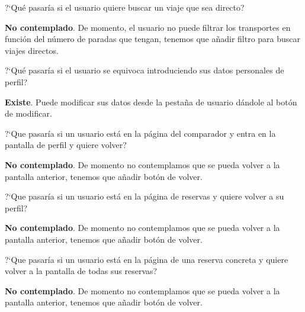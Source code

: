 \begin{escenario} %
    \centering
?`Qué pasaría si el usuario quiere buscar un viaje que sea directo? 
\begin{solucion} \centering
    \textbf{No contemplado}. De momento, el usuario no puede filtrar los transportes en función del número de paradas que tengan, tenemos que añadir filtro para buscar viajes directos.
\end{solucion}
\end{escenario}

\begin{escenario} %
    \centering
?`Qué pasaría si el usuario se equivoca introduciendo sus datos personales de perfil? 

\begin{solucion} \centering
    \textbf{Existe}. Puede modificar sus datos desde la pestaña de usuario dándole al botón de modificar.
\end{solucion}
\end{escenario}

\begin{escenario} %
    \centering
?`Que pasaría si un usuario está en la página del comparador y entra en la pantalla de perfil y quiere volver?

\begin{solucion} \centering
    \textbf{No contemplado}. De momento no contemplamos que se pueda volver a la pantalla anterior, tenemos que añadir botón de volver. 
\end{solucion}
\end{escenario}

\begin{escenario} %
    \centering
?`Que pasaría si un usuario está en la página de reservas y quiere volver a su perfil? 

\begin{solucion} \centering
    \textbf{No contemplado}. De momento no contemplamos que se pueda volver a la pantalla anterior, tenemos que añadir botón de volver. 
\end{solucion}
\end{escenario}

\begin{escenario} %
    \centering
?`Que pasaría si un usuario está en la página de una reserva concreta y quiere volver a la pantalla de todas sus reservas?

\begin{solucion} \centering
    \textbf{No contemplado}. De momento no contemplamos que se pueda volver a la pantalla anterior, tenemos que añadir botón de volver. 
\end{solucion}
\end{escenario}

